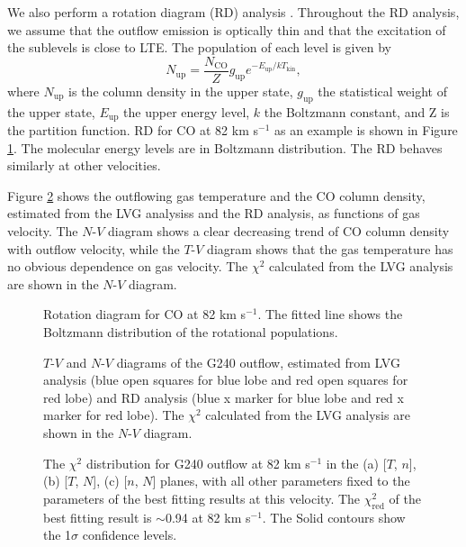 We also perform a rotation diagram (RD) analysis \citep{1999ApJ...517..209G}. Throughout the RD analysis, we assume that the outflow emission is optically thin and that the excitation of the sublevels is close to  LTE. The population of each level is given by 
\begin{equation}
N_{\mathrm{up}} = \frac{N_\mathrm{CO}}{Z} g_\mathrm{up} e^{-E_\mathrm{up}/kT_\mathrm{kin}},
\end{equation}
where $N_\mathrm{up}$ is the column density in the upper state, $g_\mathrm{up}$ the statistical weight of the upper state, $E_\mathrm{up}$ the upper energy level, $k$ the Boltzmann constant, and Z is the partition function.
RD for CO at 82 km s$^{-1}$ as an example is shown in Figure \ref{fig3}. The molecular energy levels are in Boltzmann distribution. The RD behaves similarly at other velocities. 

Figure \ref{fig:fig4} shows the outflowing gas temperature and the CO column density, estimated from the LVG analysiss and the RD analysis, as functions of gas velocity. The $N$-$V$ diagram shows a clear decreasing trend of CO column density with outflow velocity, while the $T$-$V$ diagram shows that the gas temperature has no obvious dependence on gas velocity. The $\chi^2$ calculated from the LVG analysis are shown in the $N$-$V$ diagram.

\begin{figure}[tbp]
\caption{Rotation diagram for CO at 82 km s$^{-1}$.  The fitted line shows the Boltzmann distribution of the rotational populations. \label{fig3}}
\end{figure}

\begin{figure}
\caption{$T$-$V$ and $N$-$V$ diagrams of the G240 outflow, estimated from LVG analysis (blue open squares for blue lobe and red open squares for red lobe) and RD analysis (blue x marker for blue lobe and red x marker for red lobe). The $\chi^2$ calculated from the LVG analysis are shown in the $N$-$V$ diagram. \label{fig:fig4}}
\end{figure}

\begin{figure}
\caption{The $\chi^2$ distribution for G240 outflow at 82 km s$^{-1}$ in the (a) [$T$, $n$], (b) [$T$, $N$], (c) [$n$, $N$] planes, with all other parameters fixed to the parameters of the best fitting results at this velocity. The $\chi^2_{\mathrm{red}}$ of the best fitting result is $\sim$0.94 at 82 km s$^{-1}$. The Solid contours show the 1$\sigma$ confidence levels. \label{fig:fig5}}
\end{figure}

